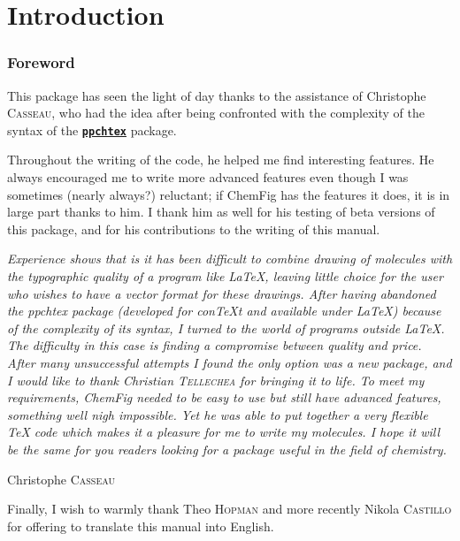 \documentclass[10pt]{article}
\newcommand\CF{{\ECFAugie ChemFig}\xspace}
\begin{document}
\parindent0pt\pagestyle{plain}
\tableofcontents
\parskip\medskipamount
\vspace{2cm}

\part{Introduction}
\section{Foreword}
This package has seen the light of day thanks to the assistance of Christophe \textsc{Casseau}, who had the idea after being confronted with the complexity of the syntax of the \href{http://www.ctan.org/tex-archive/help/Catalogue/entries/ppchtex.html}{\texttt{\textbf{ppchtex}}} package.

Throughout the writing of the code, he helped me find interesting features. He always encouraged me to write more advanced features even though I was sometimes (nearly always?) reluctant; if \CF has the features it does, it is in large part thanks to him. I thank him as well for his testing of beta versions of this package, and for his contributions to the writing of this manual.\medskip

\begingroup
{}\linewidth
{}\linewidth
\itshape\small
Experience shows that is it has been difficult to combine drawing of molecules with the typographic quality of a program like \LaTeX, leaving little choice for the user who wishes to have a vector format for these drawings. After having abandoned the \emph{ppchtex} package (developed for con\TeX t and available under \LaTeX) because of the complexity of its syntax, I turned to the world of programs outside \LaTeX. The difficulty in this case is finding a compromise between quality and price. After many unsuccessful attempts I found the only option was a new package, and I would like to thank Christian \textsc{Tellechea} for bringing it to life. To meet my requirements, \CF needed to be easy to use but still have advanced features, something well nigh impossible. Yet he was able to put together a very flexible \TeX{} code which makes it a pleasure for me to write my molecules. I hope it will be the same for you readers looking for a package useful in the field of chemistry.\smallskip

\hfill Christophe \textsc{Casseau}\linewidth
\endgroup\medskip

Finally, I wish to warmly thank Theo \textsc{Hopman} and more recently Nikola \textsc{Castillo} for offering to translate this manual into English.
\end{document}
